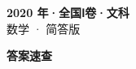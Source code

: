 \documentclass[zihao=-4, a4paper]{ctexart}
\begin{document}
\begin{center}
  {\Large\bfseries 2020 年·全国Ⅰ卷·文科}\\[4pt]
  {\large 数学 · 简答版}
\end{center}
\medskip
{}

\clearpage
{}
\begin{center}{\Large\bfseries 答案速查}\end{center}
\medskip

\end{document}
